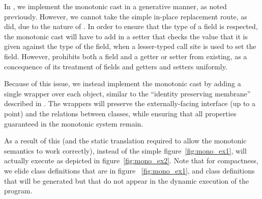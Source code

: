 \documentclass[a4paper,USenglish]{tex/lipics-v2016}
\begin{document}
In \kafka, we implement the monotonic cast in a generative manner, as noted 
previously. However, we cannot take the simple in-place replacement route, as
\cite{Siek2015} did, due to the nature of \kafka. In order to ensure that the
type of a field is respected, the monotonic cast will have to add in a setter
that checks the value that it is given against the type of the field, when
a lesser-typed call site is used to set the field. However, \kafka prohibits
both a field and a getter or setter from existing, as a concequence of its 
treatment of fields and getters and setters uniformly. 

Because of this issue, we instead implement the monotonic cast by adding a 
single wrapper over each object, similar to the ``identity preserving membrane''
described in \cite{keil_et_al:DARTS:2015:5511}. The wrappers will preserve the
externally-facing interface (up to a point) and the relations between classes,
while ensuring that all properties guaranteed in the monotonic system remain.

As a result of this (and the static translation required to allow the monotonic
semantics to work correctly), instead of the simple figure~\ref{fig:mono_ex1}, 
\kafka will actually execute as depicted in figure~\ref{fig:mono_ex2}. Note that
for compactness, we elide class definitions that are in figure
~\ref{fig:mono_ex1}, and class definitions that will be generated but that
do not appear in the dynamic execution of the program.
\end{document}
